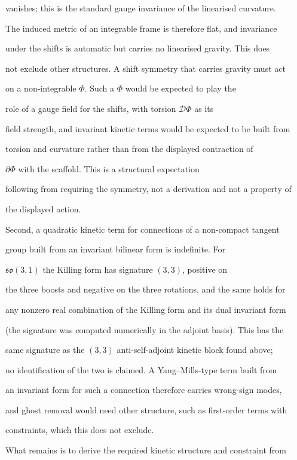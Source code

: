 vanishes; this is the standard gauge invariance of the linearised curvature.

The induced metric of an integrable frame is therefore flat, and invariance

under the shifts is automatic but carries no linearised gravity.  This does

not exclude other structures.  A shift symmetry that carries gravity must act

on a non-integrable \(\Phi\).  Such a \(\Phi\) would be expected to play the

role of a gauge field for the shifts, with torsion \(\mathcal{D}\Phi\) as its

field strength, and invariant kinetic terms would be expected to be built from

torsion and curvature rather than from the displayed contraction of

\(\partial\Phi\) with the scaffold.  This is a structural expectation

following from requiring the symmetry, not a derivation and not a property of

the displayed action.



Second, a quadratic kinetic term for connections of a non-compact tangent

group built from an invariant bilinear form is indefinite.  For

\(\mathfrak{so}(3,1)\) the Killing form has signature \((3,3)\), positive on

the three boosts and negative on the three rotations, and the same holds for

any nonzero real combination of the Killing form and its dual invariant form

(the signature was computed numerically in the adjoint basis).  This has the

same signature as the \((3,3)\) anti-self-adjoint kinetic block found above;

no identification of the two is claimed.  A Yang--Mills-type term built from

an invariant form for such a connection therefore carries wrong-sign modes,

and ghost removal would need other structure, such as first-order terms with

constraints, which this does not exclude.



What remains is to derive the required kinetic structure and constraint from

